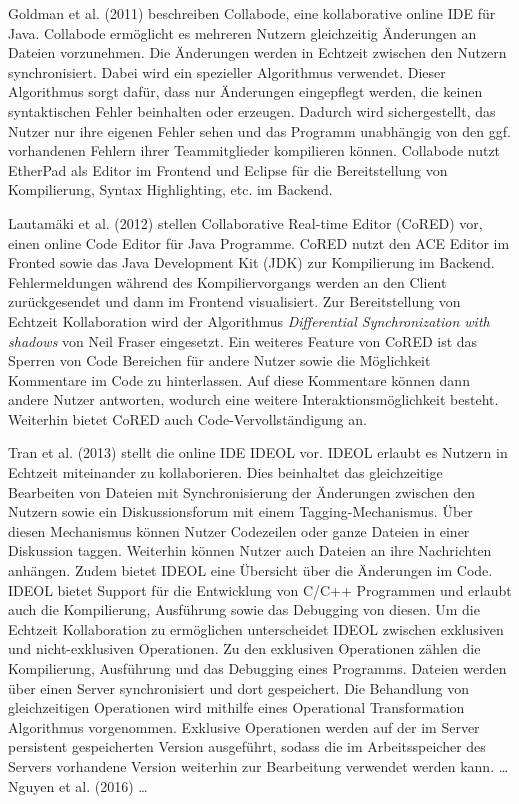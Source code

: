 Goldman et al. (2011) \cite{goldman_real-time_2011} beschreiben Collabode, eine kollaborative online IDE für Java. Collabode ermöglicht es mehreren Nutzern gleichzeitig Änderungen an Dateien vorzunehmen. Die Änderungen werden in Echtzeit zwischen den Nutzern synchronisiert. Dabei wird ein spezieller Algorithmus verwendet. Dieser Algorithmus sorgt dafür, dass nur Änderungen eingepflegt werden, die keinen syntaktischen Fehler beinhalten oder erzeugen. Dadurch wird sichergestellt, das Nutzer nur ihre eigenen Fehler sehen und das Programm unabhängig von den ggf. vorhandenen Fehlern ihrer Teammitglieder kompilieren können. Collabode nutzt EtherPad \cite{noauthor_etherpad_nodate} als Editor im Frontend und Eclipse \cite{noauthor_eclipse_nodate} für die Bereitstellung von Kompilierung, Syntax Highlighting, etc. im Backend. 

Lautamäki et al. (2012) \cite{lautamaki_cored_2012} stellen Collaborative Real-time Editor (CoRED) vor, einen online Code Editor für Java Programme. CoRED nutzt den ACE Editor \cite{noauthor_ace_nodate} im Fronted sowie das Java Development Kit (JDK)  zur Kompilierung im Backend. Fehlermeldungen während des Kompiliervorgangs werden an den Client zurückgesendet und dann im Frontend visualisiert. Zur Bereitstellung von Echtzeit Kollaboration wird der Algorithmus \textit{Differential Synchronization with shadows} \cite{fraser_differential_2009} von Neil Fraser eingesetzt. Ein weiteres Feature von CoRED ist das Sperren von Code Bereichen für andere Nutzer sowie die Möglichkeit Kommentare im Code zu hinterlassen. Auf diese Kommentare können dann andere Nutzer antworten, wodurch eine weitere Interaktionsmöglichkeit besteht. Weiterhin bietet CoRED auch Code-Vervollständigung an. 

Tran et al. (2013) \cite{tran_interactive_2013} stellt die online IDE IDEOL vor. IDEOL erlaubt es Nutzern in Echtzeit miteinander zu kollaborieren. Dies beinhaltet das gleichzeitige Bearbeiten von Dateien mit Synchronisierung der Änderungen zwischen den Nutzern sowie ein Diskussionsforum mit einem Tagging-Mechanismus. Über diesen Mechanismus können Nutzer Codezeilen oder ganze Dateien in einer Diskussion taggen. Weiterhin können Nutzer auch Dateien an ihre Nachrichten anhängen. Zudem bietet IDEOL eine Übersicht über die Änderungen im Code. IDEOL bietet Support für die Entwicklung von C/C++ Programmen und erlaubt auch die Kompilierung, Ausführung sowie das Debugging von diesen. Um die Echtzeit Kollaboration zu ermöglichen unterscheidet IDEOL zwischen exklusiven und nicht-exklusiven Operationen. Zu den exklusiven Operationen zählen die Kompilierung, Ausführung und das Debugging eines Programms. Dateien werden über einen Server synchronisiert und dort gespeichert. Die Behandlung von gleichzeitigen Operationen wird mithilfe eines Operational Transformation Algorithmus  vorgenommen. Exklusive Operationen werden auf der im Server persistent gespeicherten Version ausgeführt, sodass die im Arbeitsspeicher des Servers vorhandene Version weiterhin zur Bearbeitung verwendet werden kann. \dots \\
Nguyen et al. (2016) \cite{nguyen_enhancing_2016} \dots {}

